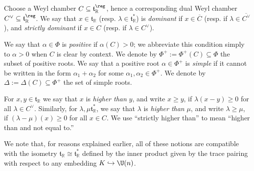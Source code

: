 \documentclass[reqno]{amsart} 
\begin{document}
\begin{definition}
  Choose a Weyl chamber $C \subseteq \mathfrak{t}_{\mathbb{R}}^{\reg}$, hence a corresponding dual Weyl chamber $C^\vee \subseteq \mathfrak{t}_{\mathbb{R}}^{\reg}$.  We say that $x \in \mathfrak{t}_{\mathbb{R}}$ (resp. $\lambda \in \mathfrak{t}_{\mathbb{R}}^*$) is \emph{dominant} if $x \in \overline{C}$ (resp. if $\lambda \in \overline{C^\vee}$), and \emph{strictly dominant} if $x \in {C}$ (resp. if $\lambda \in {C^\vee}$).
  
  We say that $\alpha \in \Phi$ is \emph{positive} if $\alpha(C) > 0$; we abbreviate this condition simply to $\alpha > 0$ when $C$ is clear by context.  We denote by $\Phi^+ := \Phi^+(C) \subseteq \Phi$ the subset of positive roots.  We say that a positive root $\alpha \in \Phi^+$ is \emph{simple} if it cannot be written in the form $\alpha_1 + \alpha_2$ for some $\alpha_1, \alpha_2 \in \Phi^+$.  We denote by $\Delta := \Delta(C) \subseteq \Phi^+$ the set of simple roots.

  For $x,y \in \mathfrak{t}_{\mathbb{R}}$ we say that $x$ is \emph{higher than} $y$, and write $x \geq y$, if $\lambda(x-y) \geq 0$ for all $\lambda \in C^\vee$.  Similarly, for $\lambda,\mu \mathfrak{t}_{\mathbb{R}}^*$, we say that $\lambda$ is \emph{higher than} $\mu$, and write $\lambda \geq \mu$, if $(\lambda - \mu)(x) \geq 0$ for all $x \in C$.  We use ``strictly higher than'' to mean ``higher than and not equal to.''
\end{definition}
We note that, for reasons explained earlier, all of these notions are compatible with the isometry $\mathfrak{t}_{\mathbb{R}} \cong \mathfrak{t}_{\mathbb{R}}^*$ defined by the inner product given by the trace pairing with respect to any embedding $K \hookrightarrow \U(n)$.
\end{document}
